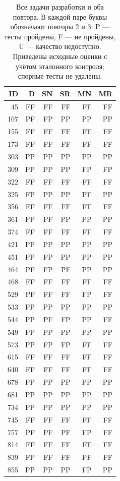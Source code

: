 \begin{table}[!htbp]\centering\footnotesize
\caption{Все задачи разработки и оба повтора. В каждой паре буквы обозначают повторы 2 и 3: P --- тесты пройдены, F --- не пройдены, U --- качество недоступно. Приведены исходные оценки с учётом эталонного контроля; спорные тесты не удалены.}\label{tab:dev40-all}
\begin{tabular*}{\textwidth}{@{\extracolsep{\fill}}rrrrrr}\toprule
ID & D & SN & SR & MN & MR\\\midrule
45 & FF & FF & FF & FF & FF\\
107 & PF & FP & PP & PP & PP\\
155 & FF & FF & FF & FF & FF\\
173 & FF & FF & FF & FF & FF\\
303 & PP & PP & PP & PP & PP\\
309 & PP & PP & PP & FP & FP\\
322 & FF & FF & FF & FF & FF\\
325 & FP & PP & PP & PF & PP\\
356 & FF & FF & FF & FF & FF\\
361 & PP & PF & PP & PP & PP\\
374 & FF & FF & FF & FF & FF\\
421 & PP & PP & PP & PP & PP\\
451 & PP & FP & PP & PP & PP\\
464 & PF & FP & PF & PP & PP\\
468 & FF & FF & FF & FF & FF\\
529 & PF & FF & FF & FP & FF\\
533 & PP & PP & PP & PP & PP\\
544 & PP & PF & FP & PP & FF\\
549 & PP & PP & PP & PP & PP\\
573 & PP & FP & FP & FF & FF\\
615 & FF & FF & FF & FF & FF\\
640 & FF & FF & FF & FF & FF\\
678 & PP & PP & PP & PP & PP\\
681 & PP & PP & PP & PP & PP\\
734 & PP & PP & PP & PP & PP\\
745 & FF & FF & FF & FF & FF\\
757 & PF & PF & PF & FP & FF\\
814 & FF & FF & FF & FF & FF\\
839 & FP & FF & FF & PF & FF\\
855 & PP & PP & PP & FP & PP\\

\end{tabular*}
\end{table}
